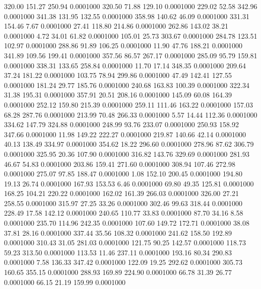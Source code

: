  320.00  151.27  250.94   0.0001000
 320.50   71.88  129.10   0.0001000
 229.02   52.58  342.96   0.0001000
 341.38  131.95  132.55   0.0001000
 358.98  140.62   46.09   0.0001000
 331.31  154.46    7.67   0.0001000
  27.41  118.80  214.86   0.0001000
 262.86  143.02   38.21   0.0001000
   4.72   34.01   61.82   0.0001000
 105.01   25.73  303.67   0.0001000
 284.78  123.51  102.97   0.0001000
 288.86   91.89  106.25   0.0001000
  11.90   47.76  188.21   0.0001000
 341.89  109.56  199.41   0.0001000
 357.56   86.57  267.17   0.0001000
 285.09   95.79  159.81   0.0001000
 338.31  133.65  258.84   0.0001000
  11.70   17.14  348.35   0.0001000
 209.64   37.24  181.22   0.0001000
 103.75   78.94  299.86   0.0001000
  47.49  142.41  127.55   0.0001000
 181.24   29.77  185.76   0.0001000
 240.68  163.83  100.39   0.0001000
 322.34   31.38  195.31   0.0001000
 357.91   20.51  208.16   0.0001000
 145.09   60.08  164.39   0.0001000
 252.12  159.80  215.39   0.0001000
 259.11  111.46  163.22   0.0001000
 157.03   68.28  287.76   0.0001000
 213.99   70.48  266.33   0.0001000
   5.57   14.44  112.36   0.0001000
 334.62  147.79  324.88   0.0001000
 248.99   93.76  233.07   0.0001000
 250.93  158.92  347.66   0.0001000
  11.98  149.22  222.27   0.0001000
 219.87  140.66   42.14   0.0001000
  40.13  138.49  334.97   0.0001000
 354.62   18.22  296.60   0.0001000
 278.96   87.62  306.79   0.0001000
 325.95   20.36  107.90   0.0001000
 316.82  143.76  329.69   0.0001000
 281.93   46.67   54.83   0.0001000
 203.86  159.41  271.60   0.0001000
 308.94  107.46  272.98   0.0001000
 275.07   97.85  188.47   0.0001000
   1.08  152.10  200.45   0.0001000
 194.80   19.13   26.74   0.0001000
 167.93  153.53    6.46   0.0001000
  69.80   49.35  125.81   0.0001000
 168.25  104.21  220.22   0.0001000
 162.02  161.39  266.03   0.0001000
 326.00   27.21  258.55   0.0001000
 315.97   27.25   33.26   0.0001000
 302.46   99.63  318.44   0.0001000
 228.49   17.58  142.12   0.0001000
 240.65  110.77   33.83   0.0001000
  87.70   34.16    8.58   0.0001000
 235.70  114.96  242.35   0.0001000
 107.60  149.72  172.71   0.0001000
  38.08   37.81   28.16   0.0001000
 337.44   35.56  108.32   0.0001000
 241.62  158.50  192.89   0.0001000
 310.43   31.05  281.03   0.0001000
 121.75   90.25  142.57   0.0001000
 118.73   59.23  313.50   0.0001000
 113.53   11.46  237.11   0.0001000
 193.16   80.34  290.83   0.0001000
   7.58  136.33  347.42   0.0001000
 122.09   19.25  292.62   0.0001000
 305.73  160.65  355.15   0.0001000
 288.93  169.89  224.90   0.0001000
  66.78   31.39   26.77   0.0001000
  66.15   21.19  159.99   0.0001000
